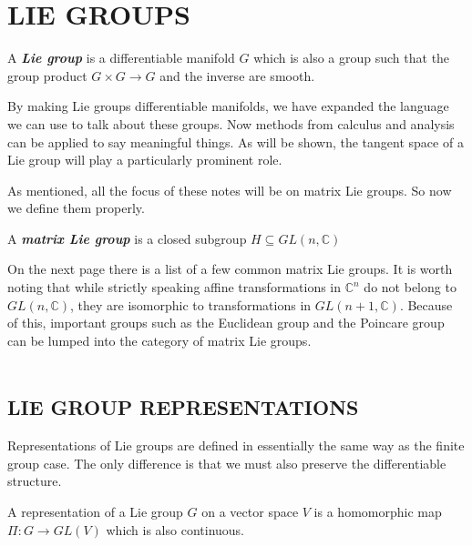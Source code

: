\documentclass[9 pt]{report}
\begin{document}
{\centering
\section*{LIE GROUPS}}

\begin{tcolorbox}
	A \textbf{\emph{Lie group}} is a differentiable manifold $G$ which is also a group such that the group product  $ G\times G \to G $ and the inverse are smooth.
\end{tcolorbox}
By making Lie groups differentiable manifolds, we have expanded the language we can use to talk about these groups. Now methods from calculus and analysis can be applied to say meaningful things. As will be shown, the tangent space of a Lie group will play a particularly prominent role. 

As mentioned, all the focus of these notes will be on matrix Lie groups. So now we define them properly. 

\begin{tcolorbox}
	A \textbf{\emph{matrix Lie group}} is a closed subgroup $H\subseteq GL(n, \mathbb{C})$
\end{tcolorbox}
On the next page there is a list of a few common matrix Lie groups. It is worth noting that while strictly speaking affine transformations in $\mathbb{C}^n$ do not belong to $GL(n,\mathbb{C})$, they are isomorphic to transformations in $GL(n+1,\mathbb{C})$. Because of this, important groups such as the Euclidean group and the Poincare group can be lumped into the category of matrix Lie groups. 
\\
\\

{\centering
\subsection*{LIE GROUP REPRESENTATIONS}}

\noindent Representations of Lie groups are defined in essentially the same way as the finite group case. The only difference is that we must also preserve the differentiable structure.

\begin{tcolorbox}
	A representation of a Lie group $G$ on a vector space $V$ is a homomorphic map $\Pi:G\to GL(V)$ which is also continuous.
\end{tcolorbox}
\end{document}
